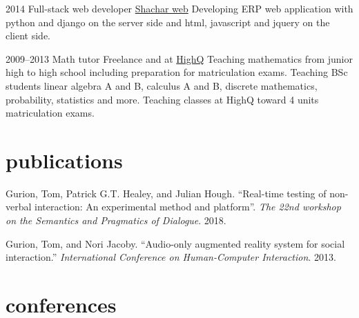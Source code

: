 \documentclass[]{friggeri-cv}
\begin{document}
\begin{entrylist}

    \entry
    {2014}
    {Full-stack web developer}
    {\href{http://www.shachar-web.co.il/}{Shachar web}}
    {
      Developing ERP web application with python and django on the server side and html, javascript and jquery on the client side.
    }

\end{entrylist}
\begin{entrylist}

    \entry
    {2009--2013}
    {Math tutor}
    {Freelance and at \href{http://high-q.co.il/}{HighQ}}
    {
      Teaching mathematics from junior high to high school including preparation for matriculation exams.
      Teaching BSc students linear algebra A and B, calculus A and B, discrete mathematics, probability, statistics and more.
      Teaching classes at HighQ toward 4 units matriculation exams.
    }

\end{entrylist}



\section{publications}

Gurion, Tom, Patrick G.T. Healey, and Julian Hough. ``Real-time testing of non-verbal interaction: An experimental method and platform''. \emph{The 22nd workshop on the Semantics and Pragmatics of Dialogue}. 2018.

Gurion, Tom, and Nori Jacoby. ``Audio-only augmented reality system for social interaction.'' \emph{International Conference on Human-Computer Interaction}. 2013.



\section{conferences}
\end{document}
